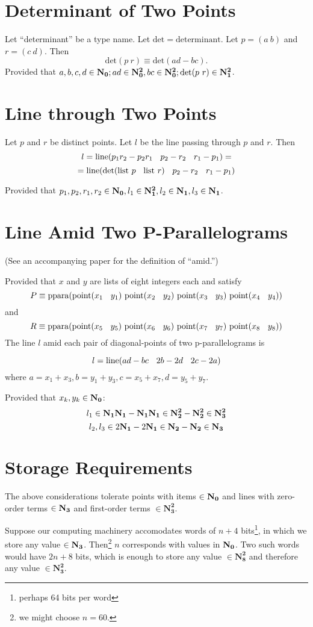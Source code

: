 \documentclass{article}
\begin{document}
\section{Determinant of Two Points}

Let ``determinant'' be a type name.
Let $\mathrm{det}=\mathrm{determinant}$.
Let $p=(a\ b)$ and $r=(c\ d)$. Then
$$\mathrm{det}(p\ r)\equiv \mathrm{det}(ad-bc).$$
Provided that $a, b, c, d\in\mathbf{N_0};
ad\in\mathbf{N_0^2}, bc\in\mathbf{N_0^2};
\mathrm{det}(p\ r)\in\mathbf{N_1^2}$.

\section{Line through Two Points}

Let $p$ and $r$ be distinct points.
Let $l$ be the line passing through $p$ and $r$.
Then
$$l=\mathrm{line}(p_1r_2-p_2r_1\en p_2-r_2\en r_1-p_1)=$$
$$=\mathrm{line}(\mathrm{det}(\mathrm{list}\ p\en \mathrm{list}\ r)\en p_2-r_2\en r_1-p_1)$$

Provided that $p_1, p_2, r_1, r_2\in\mathbf{N_0},
l_1\in\mathbf{N_1^2}, l_2\in\mathbf{N_1}, l_3\in\mathbf{N_1}$.

\section{Line Amid Two P-Parallelograms}
(See an accompanying paper for the definition of ``amid.'')

Provided that $x$ and $y$ are lists of eight integers each and
satisfy
$$P\equiv \mathrm{ppara}(
\mathrm{point}(x_1\en y_1)\
\mathrm{point}(x_2\en y_2)\
\mathrm{point}(x_3\en y_3)\
\mathrm{point}(x_4\en y_4))$$
and
$$R\equiv \mathrm{ppara}(
\mathrm{point}(x_5\en y_5)\
\mathrm{point}(x_6\en y_6)\
\mathrm{point}(x_7\en y_7)\
\mathrm{point}(x_8\en y_8))$$
The line $l$ amid each pair of diagonal-points of two p-parallelograms is

$$l=
\mathrm{line}(
ad-bc\en
2b-2d\en
2c-2a)$$
where $a=x_1+x_3, b=y_1+y_3, c=x_5+x_7, d=y_5+y_7$.

Provided that $x_k, y_k\in\mathbf{N_0}$:
$$l_1\in \mathbf{N_1}\mathbf{N_1}-\mathbf{N_1}\mathbf{N_1}\in \mathbf{N_2^2}-\mathbf{N_2^2}\in\mathbf{N_3^2}$$
$$l_2, l_3\in 2\mathbf{N_1}-2\mathbf{N_1}\in \mathbf{N_2}-\mathbf{N_2}\in \mathbf{N_3}$$

\section{Storage Requirements}
The above considerations tolerate
points with items $\in\mathbf{N_0}$ and
lines with zero-order terms $\in\mathbf{N_3}$ and
first-order terms $\in\mathbf{N_3^2}$.

Suppose our computing machinery accomodates words of
$n+4$ bits\footnote{perhaps 64 bits per word},
in which we store any value $\in\mathbf{N_3}$.
Then\footnote{we might choose $n=60$.}
$n$ corresponds with values in $\mathbf{N_0}$.
Two such words would have $2n+8$ bits,
which is enough to store any value $\in\mathbf{N_8^2}$ and therefore
any value $\in\mathbf{N_3^2}$.
\end{document}
